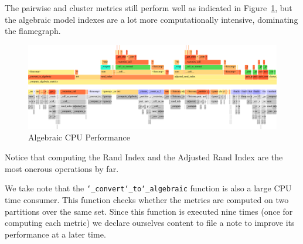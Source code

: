 \documentclass{article}
\begin{document}
    The pairwise and cluster metrics still perform well as indicated in
    Figure~\ref{appendix:fig:alg-cpu-perf}, but the algebraic model indexes are
    a lot more computationally intensive, dominating the flamegraph.

    \begin{figure}[htbp]
        \includegraphics[width=\textwidth]{performance/algebraic-flamegraph}
        \caption{Algebraic CPU Performance}\label{appendix:fig:alg-cpu-perf}
    \end{figure}

    Notice that computing the Rand Index and the Adjusted Rand Index are the
    most onerous operations by far.

    We take note that the \texttt{\char`_convert\char`_to\char`_algebraic}
    function is also a large CPU time consumer.
    This function checks whether the metrics are computed on two partitions over
    the same set.
    Since this function is executed nine times (once for computing each metric)
    we declare ourselves content to file a note to improve its performance at a
    later time.


{
    \small
    
}
\end{document}

